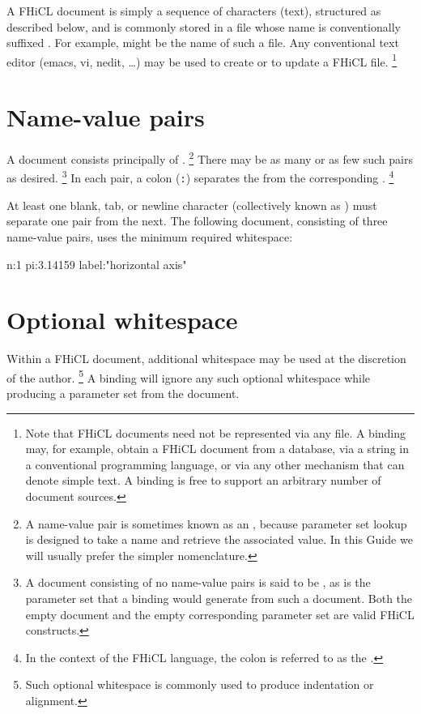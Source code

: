 \documentclass[draftmode,draftwater]{memarticle}
\newcommand{\fhicl}{FHiCL\xspace}
\begin{document}
A \fhicl document is simply a sequence of characters (\ie text),
structured as described below, and is commonly stored in a file whose
name is conventionally suffixed .  For example,
 might be the name of such a file.  Any
conventional text editor (\eg emacs, vi, nedit, \ldots) may be used to
create or to update a \fhicl file.%
\footnote{%
  Note that \fhicl documents need not be represented via any file.  A
  binding may, for example, obtain a \fhicl document from a database,
  via a string in a conventional programming language, or via any
  other mechanism that can denote simple text.  A binding is free to
  support an arbitrary number of document sources.%
}

\section{Name-value pairs}

A document consists principally of .%
\footnote{%
  A name-value pair is sometimes known as an ,
  because parameter set lookup is designed to take a name and retrieve
  the associated value.  In this Guide we will usually prefer the
  simpler  nomenclature.%
} There may be as many or as few such pairs as desired.%
\footnote{%
  A document consisting of no name-value pairs is said to be
  , as is the parameter set that a binding would generate
  from such a document.  Both the empty document and the empty
  corresponding parameter set are valid FHiCL constructs.%
} In each pair, a colon (\verb|:|) separates the  from the
corresponding .%
\footnote{%
  In the context of the FHiCL language, the colon is referred to as
  the .  }

At least one blank, tab, or newline character (collectively known as
) must separate one pair from the next.  The
following document, consisting of three name-value pairs, uses the
minimum required whitespace: 
\Needspace{.17in}
\begin{fcllisting}[texcl,escapechar=`]
n:1 pi:3.14159 label:"horizontal axis"
\end{fcllisting}

\section{Optional whitespace}

Within a \fhicl document, additional whitespace may be used at the
discretion of the author.%
\footnote{%
  Such optional whitespace is commonly used to produce indentation or
  alignment.%
} A binding will ignore any such optional whitespace while producing a
parameter set from the document.
\end{document}
